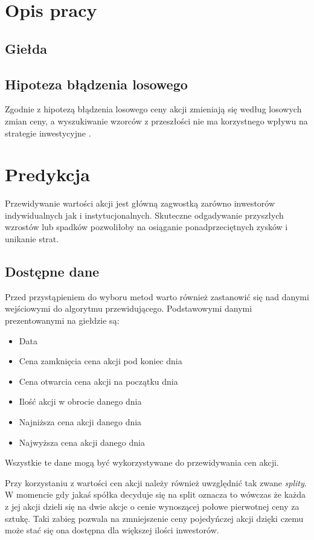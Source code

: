 \documentclass[a4paper, twoside, 11pt, openright]{article}
\begin{document}
\section{Opis pracy}

\subsection{Giełda}

\subsection{Hipoteza błądzenia losowego}

Zgodnie z hipotezą błądzenia losowego ceny akcji zmieniają się według losowych zmian ceny, a wyszukiwanie wzorców z przeszłości nie ma korzystnego wpływu na strategie inwestycyjne  \cite{randwalk}. 

\section{Predykcja}

Przewidywanie wartości akcji jest główną zagwostką zarówno inwestorów indywidualnych jak i instytucjonalnych. Skuteczne odgadywanie przyszłych wzrostów lub spadków pozwoliłoby na osiąganie ponadprzeciętnych zysków i unikanie strat.

\subsection{Dostępne dane}

Przed przystąpieniem do wyboru metod warto również zastanowić się nad danymi wejściowymi do algorytmu przewidującego. Podstawowymi danymi prezentowanymi na giełdzie są:
\begin{itemize}
\item{Data}
\item{Cena zamknięcia} cena akcji pod koniec dnia
\item{Cena otwarcia} cena akcji na początku dnia
\item{Ilość akcji w obrocie danego dnia}
\item{Najniższa cena akcji danego dnia}
\item{Najwyższa cena akcji danego dnia}
\end{itemize}

Wszystkie te dane mogą być wykorzystywane do przewidywania cen akcji.

 Przy korzystaniu z wartości cen akcji należy również uwzględnić tak zwane \textit{splity}. W momencie gdy jakaś spółka decyduje się na split oznacza to wówczas że każda z jej akcji dzieli się na dwie akcje o cenie wynoszącej połowe pierwotnej ceny za sztukę. Taki zabieg pozwala na zmniejszenie ceny pojedyńczej akcji dzięki czemu może stać się ona dostępna dla większej ilości inwestorów. 
\end{document}
